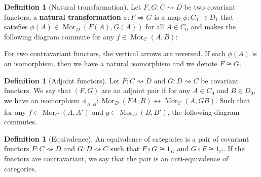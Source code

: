 \documentclass[paper=a4, fontsize=12pt]{scrartcl} %
\theoremstyle{definition}
\newtheorem{defn}[thm]{Definition}
\theoremstyle{remark}
\DeclareMathOperator{\Mor}{Mor}
\begin{document}
\begin{defn}[Natural transformation]\label{defnattran}
	Let $F,G : C \rightsquigarrow D$ be two covariant functors, a \textbf{natural transformation} $\phi: F \Rightarrow G$ is a map $\phi: C_0 \rightarrow D_1$ that satisfies $\phi(A) \in \Mor_D(F(A), G(A))$ for all $A \in C_0$ and makes the following diagram commute for any $f \in \Mor_C(A,B)$:
	\begin{figure}[H]
		\centering
	\end{figure}
	For two contravariant functors, the vertical arrows are reversed. If each $\phi(A)$ is an isomorphism, then we have a natural isomorphism and we denote $F \cong G$.
\end{defn}
\begin{defn}[Adjoint functors]
	Let $F:C\rightsquigarrow D$ and $G:D\rightsquigarrow C$ be covariant functors. We say that $(F,G)$ are an adjoint pair if  for any $A \in C_0$ and $B \in D_0$, we have an isomorphism $\phi_{A,B} : \Mor_D(FA, B) \leftrightarrow \Mor_C(A, GB)$. Such that for any $f \in \Mor_C(A,A')$ and $g \in \Mor_D(B,B')$, the following diagram commutes.
	\begin{figure}[h]
		\centering
	\end{figure}
\end{defn}
\begin{defn}[Equivalence]
	An equivalence of categories is a pair of covariant functors $F:C\rightsquigarrow D$ and $G:D \rightsquigarrow C$ such that $F\circ G \cong 1_{D}$ and $G \circ F \cong 1_{C}$. If the functors are contravariant, we say that the pair is an anti-equivalence of categories.
\end{defn}
\end{document}
